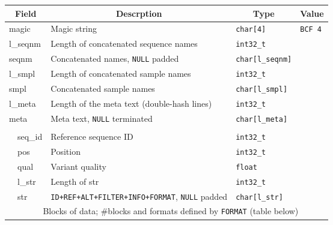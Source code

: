\documentclass[10pt,pdftex]{article}
\begin{document}
\vspace{1\baselineskip}

\begin{center}
\begin{tabular}{|l|l|l|l|l|}
\hline
\multicolumn{2}{|c|}{\bf Field} & \multicolumn{1}{c|}{\bf Descrption} & \multicolumn{1}{c|}{\bf Type} & \multicolumn{1}{c|}{\bf Value} \\\hline\hline
\multicolumn{2}{|l|}{\sf magic} & Magic string & {\tt char[4]} & {\tt BCF\char92 4} \\\hline
\multicolumn{2}{|l|}{\sf l\_seqnm} & Length of concatenated sequence names & {\tt int32\_t} & \\\hline
\multicolumn{2}{|l|}{\sf seqnm} & Concatenated names, {\tt NULL} padded & {\tt char[{\sf l\_seqnm}]} & \\\hline
\multicolumn{2}{|l|}{\sf l\_smpl} & Length of concatenated sample names & {\tt int32\_t} & \\\hline
\multicolumn{2}{|l|}{\sf smpl} & Concatenated sample names & {\tt char[{\sf l\_smpl}]} & \\\hline
\multicolumn{2}{|l|}{\sf l\_meta} & Length of the meta text (double-hash lines)& {\tt int32\_t} & \\\hline
\multicolumn{2}{|l|}{\sf meta} & Meta text, {\tt NULL} terminated & {\tt char[{\sf l\_meta}]} & \\\hline
\multicolumn{5}{|c|}{\it \color{gray}{List of records until the end of the file}}\\\cline{2-5}
& {\sf seq\_id} & Reference sequence ID & {\tt int32\_t} & \\\cline{2-5}
& {\sf pos} & Position & {\tt int32\_t} & \\\cline{2-5}
& {\sf qual} & Variant quality & {\tt float} & \\\cline{2-5}
& {\sf l\_str} & Length of {\sf str} & {\tt int32\_t} & \\\cline{2-5}
& {\sf str} & {\tt ID+REF+ALT+FILTER+INFO+FORMAT}, {\tt NULL} padded & {\tt char[{\sf l\_str}]} &\\\cline{2-5}
& \multicolumn{4}{c|}{Blocks of data; \#blocks and formats defined by {\tt FORMAT} (table below)}\\
\hline
\end{tabular}
\end{center}
\end{document}
